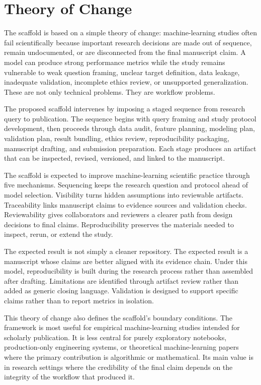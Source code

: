 \section{Theory of Change}

The scaffold is based on a simple theory of change: machine-learning studies often fail scientifically because important research decisions are made out of sequence, remain undocumented, or are disconnected from the final manuscript claim. A model can produce strong performance metrics while the study remains vulnerable to weak question framing, unclear target definition, data leakage, inadequate validation, incomplete ethics review, or unsupported generalization. These are not only technical problems. They are workflow problems.

The proposed scaffold intervenes by imposing a staged sequence from research query to publication. The sequence begins with query framing and study protocol development, then proceeds through data audit, feature planning, modeling plan, validation plan, result bundling, ethics review, reproducibility packaging, manuscript drafting, and submission preparation. Each stage produces an artifact that can be inspected, revised, versioned, and linked to the manuscript.

The scaffold is expected to improve machine-learning scientific practice through five mechanisms. Sequencing keeps the research question and protocol ahead of model selection. Visibility turns hidden assumptions into reviewable artifacts. Traceability links manuscript claims to evidence sources and validation checks. Reviewability gives collaborators and reviewers a clearer path from design decisions to final claims. Reproducibility preserves the materials needed to inspect, rerun, or extend the study.

The expected result is not simply a cleaner repository. The expected result is a manuscript whose claims are better aligned with its evidence chain. Under this model, reproducibility is built during the research process rather than assembled after drafting. Limitations are identified through artifact review rather than added as generic closing language. Validation is designed to support specific claims rather than to report metrics in isolation.

This theory of change also defines the scaffold's boundary conditions. The framework is most useful for empirical machine-learning studies intended for scholarly publication. It is less central for purely exploratory notebooks, production-only engineering systems, or theoretical machine-learning papers where the primary contribution is algorithmic or mathematical. Its main value is in research settings where the credibility of the final claim depends on the integrity of the workflow that produced it.
